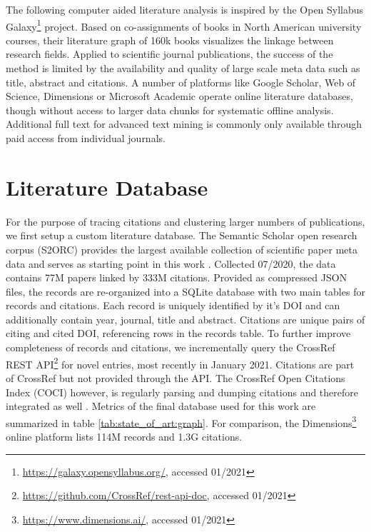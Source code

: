 The following computer aided literature analysis is inspired by the Open Syllabus Galaxy\footnote{\url{https://galaxy.opensyllabus.org/}, accessed 01/2021} project.
Based on co-assignments of books in North American university courses, their literature graph of 160k books visualizes the linkage between research fields.
Applied to scientific journal publications, the success of the method is limited by the availability and quality of large scale meta data such as title, abstract and citations.
A number of platforms like Google Scholar, Web of Science, Dimensions or Microsoft Academic operate online literature databases, though without access to larger data chunks for systematic offline analysis.
Additional full text for advanced text mining is commonly only available through paid access from individual journals.




\section{Literature Database}
\label{sec:state_of_art:database}

For the purpose of tracing citations and clustering larger numbers of publications, we first setup a custom literature database.
The Semantic Scholar open research corpus (S2ORC) provides the largest available collection of scientific paper meta data and serves as starting point in this work \cite{Lo2020}.
Collected 07/2020, the data contains 77M papers linked by 333M citations.
Provided as compressed JSON files, the records are re-organized into a SQLite database with two main tables for records and citations.
Each record is uniquely identified by it's DOI and can additionally contain year, journal, title and abstract.
Citations are unique pairs of citing and cited DOI, referencing rows in the records table.
To further improve completeness of records and citations, we incrementally query the CrossRef REST API\footnote{\url{https://github.com/CrossRef/rest-api-doc}, accessed 01/2021} for novel entries, most recently in January 2021.
Citations are part of CrossRef but not provided through the API.
The CrossRef Open Citations Index (COCI) however, is regularly parsing and dumping citations and therefore integrated as well \cite{Peroni2020}.
Metrics of the final database used for this work are summarized in table \ref{tab:state_of_art:graph}. 
For comparison, the Dimensions\footnote{\url{https://www.dimensions.ai/}, accessed 01/2021} online platform lists 114M records and 1.3G citations.

